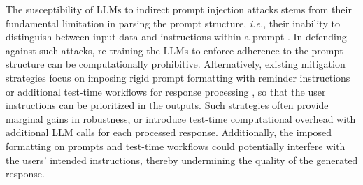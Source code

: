 The susceptibility of LLMs to indirect prompt injection attacks stems from their fundamental limitation in parsing the prompt structure,
\emph{i.e.}, their inability to distinguish between input data and instructions within a prompt \cite{zverev2024can,chen2024struq}.
In defending against such attacks, re-training the LLMs \cite{chen2024struq, piet2024jatmo, chen2024aligning, liu2025drip} to enforce adherence to the prompt structure can be computationally prohibitive.
Alternatively, existing mitigation strategies  
focus on imposing rigid
prompt formatting with reminder instructions \citep{wu2023defending,schulhoff2023ignore, hines2024defending} or additional test-time workflows for response processing \citep{wang2024fath, jia2025task}, so that the user instructions can be prioritized in the outputs. 
Such strategies often provide marginal gains in robustness, 
or introduce test-time computational overhead with additional LLM calls for each processed response.
Additionally, the imposed formatting on prompts and test-time workflows could potentially interfere with the users' intended instructions, thereby undermining the quality of the generated response.

